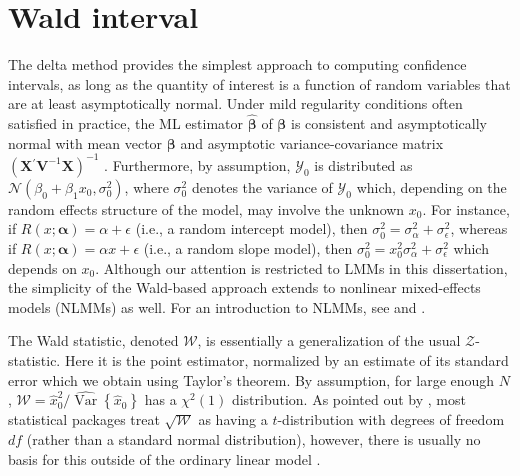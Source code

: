 \documentclass[cmfont,usenames,dvipsnames,leqno]{afit-etd}\usepackage[]{graphicx}\usepackage[]{color}
\newcommand{\trans}{\ensuremath{^\prime}}
\newcommand{\mc}[1]{\ensuremath{\mathcal{#1}}}
\newcommand{\wh}[1]{\ensuremath{\widehat{#1}}}
\newcommand{\var}{\operatorname{Var}}
\newcommand{\X}{\ensuremath{\bm{X}}}
\begin{document}
\section{Wald interval}
\label{sec:calibration-lmm-wald}
The delta method provides the simplest approach to computing confidence intervals, as long as the quantity of interest is a function of random variables that are at least asymptotically normal. Under mild regularity conditions often satisfied in practice, the ML estimator $\wh{\bm{\beta}}$ of $\bm{\beta}$ is consistent and asymptotically normal with mean vector $\bm{\beta}$ and asymptotic variance-covariance matrix $\left(\X\trans\bm{V}^{-1}\X\right)^{-1}$ \citep{pinheiro_topics_1994}. Furthermore, by assumption, $\mc{Y}_0$ is distributed as $\mc{N}\left(\beta_0 + \beta_1 x_0, \sigma_0^2\right)$, where $\sigma_0^2$ denotes the variance of $\mc{Y}_0$ which, depending on the random effects structure of the model, may involve the unknown $x_0$. For instance, if $R\left(x; \bm{\alpha}\right) = \alpha + \epsilon$ (i.e., a random intercept model), then $\sigma_0^2 = \sigma_\alpha^2 + \sigma_\epsilon^2$, whereas if $R\left(x; \bm{\alpha}\right) = \alpha x + \epsilon$ (i.e., a random slope model), then $\sigma_0^2 = x_0^2\sigma_\alpha^2 + \sigma_\epsilon^2$ which depends on $x_0$. Although our attention is restricted to LMMs in this dissertation, the simplicity of the Wald-based approach extends to nonlinear mixed-effects models (NLMMs) as well. For an introduction to NLMMs, see \citet{pinheiro_topics_1994} and \citet{pinheiro_mixed_2009}.

The Wald statistic, denoted $\mc{W}$, is essentially a generalization of the usual $\mc{Z}$-statistic. Here it is the point estimator, normalized by an estimate of its standard error which we obtain using Taylor's theorem. By assumption, for large enough $N$, $\mc{W} = \wh{x}_0^2/\wh{\var}\left\{\wh{x}_0\right\}$ has a $\chi^2(1)$ distribution. As pointed out by \citet[p. 184]{harrell_regression_2001}, most statistical packages treat $\sqrt{\mc{W}}$ as having a $t$-distribution  with degrees of freedom $df$ (rather than a standard normal distribution), however, there is usually no basis for this outside of the ordinary linear model \citep{gould_confidence_1993}.
\end{document}
